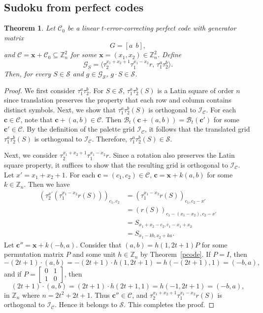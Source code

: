 \documentclass{article}
\newtheorem{theorem}{Theorem}[section]
\theoremstyle{definition}
\begin{document}
\subsection{Sudoku from perfect codes}
\begin{theorem}\label{pSudoku}
Let $\mathcal{C}_0$ be a linear $t$-error-correcting perfect code with generator matrix
\[
G=[a~~b],
\]
and $\mathcal{C}=\mathbf{x}+\mathcal{C}_0\subseteq\mathbb{Z}_n^2$ for some $\mathbf{x}=(x_1, x_2)\in\mathbb{Z}_n^2$.
Define
	\[
	\mathcal{G}_S=\langle \tau_2^{x_1+x_2+1}\tau_1^{x_1-x_2}r,\, \tau_1^a\tau_2^b\rangle.
	\]
	Then, for every $S\in \mathcal{S}$ and $g\in \mathcal{G}_\mathcal{S}$, $g\cdot S\in \mathcal{S}$.
\end{theorem}
\begin{proof}
	We first consider $\tau_1^a\tau_2^b$. For $S\in \mathcal{S}$, $\tau_1^a\tau_2^b(S)$ is a Latin square of order $n$ since translation preserves the property that each row and column contains distinct symbols. Next, we show that $\tau_1^a \tau_2^b(S)$ is orthogonal to $\mathcal{I}_{\mathcal{C}}$. For each $\mathbf{c}\in \mathcal{C}$, note that $\mathbf{c}+(a, b)\in\mathcal{C}$. Then $\mathcal{B}_t(\mathbf{c}+(a, b))=\mathcal{B}_t(\mathbf{c}')$ for some $\mathbf{c}'\in\mathcal{C}$. By the definition of the palette grid $\mathcal{I}_{\mathcal{C}}$, it follows that the translated grid $\tau_1^a \tau_2^b(S)$ is orthogonal to $\mathcal{I}_{\mathcal{C}}$. Therefore, $\tau_1^a \tau_2^b(S)\in \mathcal{S}$.
	
	Next, we consider $\tau_2^{x_1 + x_2 + 1} \tau_1^{x_1 - x_2} r$. Since a rotation also preserves the Latin square property, it suffices to show that the resulting grid is orthogonal to $\mathcal{I}_{\mathcal{C}}$. Let $x'=x_1+x_2+1$. For each $\mathbf{c}=(c_1, c_2)\in\mathcal{C}$, $\mathbf{c}=\mathbf{x}+k(a, b)$ for some $k\in\mathbb{Z}_n$. Then we have
		\begin{align*}
			(\tau_2^{x'}(\tau_1^{x_1 - x_2} r(S)))_{c_1, c_2}&=(\tau_1^{x_1 - x_2} r(S))_{c_1, c_2-x'}\\&=(r(S))_{c_1-(x_1-x_2), c_2-x'}\\&=S_{x_1+x_2-c_2, c_1-x_1+x_2}\\&=S_{x_1-kb, x_2+ka}.
		\end{align*}
		Let $\mathbf{c}''=\mathbf{x}+k(-b, a)$. Consider that $(a, b)=h(1, 2t+1)P$ for some permutation matrix $P$ and some unit $h\in\mathbb{Z}_n$ by Theorem~\ref{pcode}. If $P=I$, then
			\[
			-(2t+1)\cdot(a, b)=-(2t+1)\cdot h(1, 2t+1)=h(-(2t+1), 1)=(-b, a),
			\]
		and if $P=\begin{bmatrix} 0 & 1\\1 & 0\end{bmatrix}$, then
		\[
		(2t+1)\cdot(a, b)=(2t+1)\cdot h(2t+1, 1)=h(-1, 2t+1)=(-b, a),
		\]
        in $\mathbb{Z}_n$ where $n=2t^2+2t+1$.
		Thus $\mathbf{c}''\in\mathcal{C}$, and $\tau_2^{x_1 + x_2 + 1} \tau_1^{x_1 - x_2} r(S)$ is orthogonal to $\mathcal{I}_{\mathcal{C}}$. Hence it belongs to $\mathcal{S}$. This completes the proof.
\end{proof}
\end{document}
